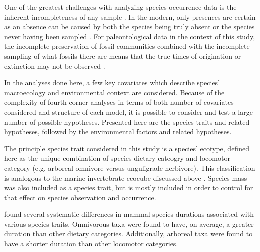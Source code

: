 \documentclass[12pt,letterpaper]{article}
\begin{document}
One of the greatest challenges with analyzing species occurrence data is the inherent incompleteness of any sample \citep{Royle2008,Royle2014,Foote1999a,Foote2001,Lloyd2011,Wang2016b}. In the modern, only presences are certain as an absence can be caused by both the species being truly absent or the species never having been sampled \citep{Royle2008,Royle2014}. For paleontological data in the context of this study, the incomplete preservation of fossil communities combined with the incomplete sampling of what fossils there are means that the true times of origination or extinction may not be observed \citep{Foote1999a,Foote2001,Wang2015,Wang2016b}.



In the analyses done here, a few key covariates which describe species' macroecology and environmental context are considered. Because of the complexity of fourth-corner analyses in terms of both number of covariates considered and structure of each model, it is possible to consider and test a large number of possible hypotheses. Presented here are the species traits and related hypotheses, followed by the environmental factors and related hypotheses.

The principle species trait considered in this study is a species' ecotype, defined here as the unique combination of species dietary cateogry and locomotor category (e.g. arboreal omnivore versus unguligrade herbivore). This classification is analogous to the marine invertebrate ecocube discussed above \citep{Bush2007,Bambach2008,Bush2011}. Species mass was also included as a species trait, but is mostly included in order to control for that effect on species observation and occurrence.


\citet{Smits2015b} found several systematic differences in mammal species durations associated with various species traits. Omnivorous taxa were found to have, on average, a greater duration than other dietary categories. Additionally, arboreal taxa were found to have a shorter duration than other locomotor categories. 
\end{document}
